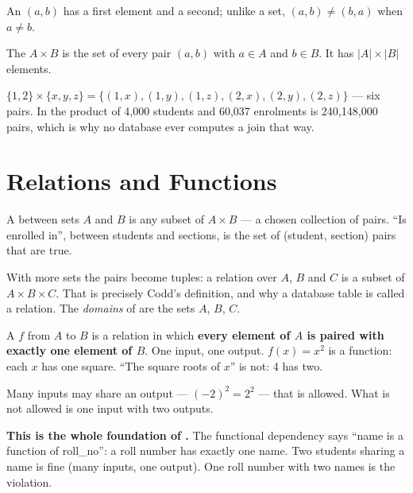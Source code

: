 \begin{definitionbox}
An  $(a, b)$ has a first element and a second; unlike a
set, $(a,b) \neq (b,a)$ when $a \neq b$.

\smallskip
The  $A \times B$ is the set of every pair $(a, b)$
with $a \in A$ and $b \in B$. It has $|A| \times |B|$ elements.

\smallskip
$\{1,2\} \times \{x, y, z\} = \{(1,x), (1,y), (1,z), (2,x), (2,y), (2,z)\}$ ---
six pairs. In  the product of 4{,}000 students and 60{,}037
enrolments is 240{,}148{,}000 pairs, which is why no database ever computes a
join that way.
\end{definitionbox}

\section{Relations and Functions}

\begin{definitionbox}
A  between sets $A$ and $B$ is any subset of $A \times B$ ---
a chosen collection of pairs. ``Is enrolled in'', between students and
sections, is the set of (student, section) pairs that are true.

\smallskip
With more sets the pairs become tuples: a relation over $A$, $B$ and $C$ is a
subset of $A \times B \times C$. That is precisely Codd's definition, and why a
database table is called a relation. The \emph{domains} of 
are the sets $A$, $B$, $C$.
\end{definitionbox}

\begin{definitionbox}
A  $f$ from $A$ to $B$ is a relation in which \textbf{every
element of $A$ is paired with exactly one element of $B$}. One input, one
output. $f(x) = x^2$ is a function: each $x$ has one square. ``The square
roots of $x$'' is not: 4 has two.

\smallskip
Many inputs may share an output --- $(-2)^2 = 2^2$ --- that is allowed. What
is not allowed is one input with two outputs.

\smallskip
\textbf{This is the whole foundation of .} The functional
dependency  says ``name is a function of roll\_no'': a roll
number has exactly one name. Two students sharing a name is fine (many inputs,
one output). One roll number with two names is the violation.
\end{definitionbox}

